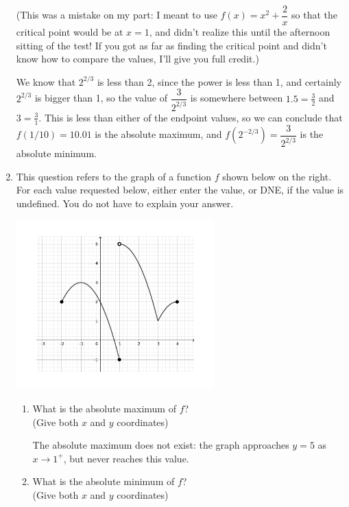 \documentclass[12pt]{article}
\newcommand{\points}[1]{\marginpar{\hspace{24pt}[#1]}}
\begin{document}
\begin{enumerate}
(This was a mistake on my part: I meant to use $f(x) = x^2+\dfrac{2}{x}$ so that the critical point would be at $x=1$, and didn't realize this until the afternoon sitting of the test! If you got as far as finding the critical point and didn't know how to compare the values, I'll give you full credit.)

We know that $2^{2/3}$ is less than 2, since the power is less than 1, and certainly $2^{2/3}$ is bigger than 1, so the value of $\dfrac{3}{2^{2/3}}$ is somewhere between $1.5 = \frac{3}{2}$ and $3=\frac{3}{1}$. This is less than either of the endpoint values, so we can conclude that $f(1/10) = 10.01$ is the absolute maximum, and $f(2^{-2/3})=\dfrac{3}{2^{2/3}}$ is the absolute minimum.

\newpage

  
 \item This question refers to the graph of a function $f$ shown below on the right. For each value requested below, either enter the value, or DNE, if the value is undefined. You do not have to explain your answer.\points{4}
 
 \begin{center}
 \includegraphics[width=0.6\textwidth]{TT3_fig1}
 \end{center}
 
 
 \begin{enumerate}
 \item What is the absolute maximum of $f$?\\
 (Give both $x$ and $y$ coordinates)
 
 \medskip
 
 The absolute maximum does not exist: the graph approaches $y=5$ as $x\to 1^+$, but never reaches this value.
 
 \medskip
 
 \item What is the absolute minimum of $f$?\\
  (Give both $x$ and $y$ coordinates)


\end{enumerate}
\end{enumerate}
\end{document}
